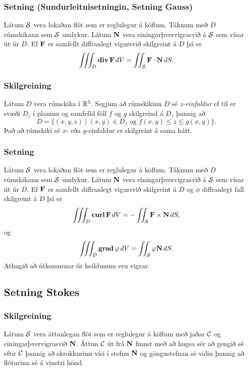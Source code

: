 \subsubsection{Setning \rtask{} (Sundurleitnisetningin, Setning Gauss) }
 Látum $\cal S$ vera lokaðan flöt sem er reglulegur á köflum.  Táknum með $D$ rúmskikann sem $\cal S$ umlykur.  Látum $\mbox{${\bf N}$}$ vera einingarþvervigrasvið á $\cal S$   sem vísar út úr $D$.  Ef $\mbox{${\bf F}$}$ er samfellt diffranlegt vigursvið skilgreint á $D$ þá er 
$$\thrint_D \dive \Fv\,dV=\tvint_{\cal S} \Fv\cdot\Nv\,dS.$$



\subsubsection{Skilgreining \rtask{}}
 Látum $D$ vera rúmskika í ${\mathbb R}^3$.  Segjum að rúmskikinn $D$ sé $z$-{\em einfaldur} ef til er svæði $D_z$ í planinu og samfelld föll $f$ og $g$ skilgreind á $D_z$ þannig að 
$$D=\{(x,y,z)\mid (x,y)\in D_z\mbox{ og }f(x,y)\leq z\leq g(x,y)\}.$$
Það að rúmskiki sé $x$- eða $y$-einfaldur er skilgreint á sama hátt. 





\subsubsection{Setning \rtask{}}
Látum $\cal S$ vera lokaðan flöt sem er reglulegur á köflum.  Táknum með $D$ rúmskikann sem $\cal S$ umlykur.  Látum $\mbox{${\bf N}$}$ vera einingarþvervigrasvið á $\cal S$   sem vísar út úr $D$.  Ef $\mbox{${\bf F}$}$ er samfellt diffranlegt vigursvið skilgreint á $D$ og $\phi$ diffranlegt fall skilgreint á $D$ þá er
$$\thrint_D\curl \Fv\,dV=-\tvint_{\cal S}\Fv\times\Nv\,dS,$$
og 
$$\thrint_D\grad\phi\,dV=\tvint_{\cal S}\phi\Nv\,dS.$$
Athugið að útkomurnar úr heildunum eru vigrar.




\subsection{Setning Stokes} 

\subsubsection{Skilgreining \rtask{}}
Látum $\cal S$ vera áttanlegan flöt sem er
reglulegur á köflum með
jaðar $\cal C$ og einingarþver\-vigrasvið $\mbox{${\bf N}$}$.  Áttun $\cal C$ út frá
$\mbox{${\bf N}$}$ finnst með að hugsa sér að gengið sé eftir $\cal C$
þannig að skrokkurinn vísi í stefnu $\mbox{${\bf N}$}$ og göngustefnan sé valin 
þannig að flöturinn sé á vinstri hönd. 



